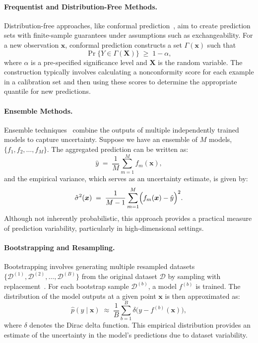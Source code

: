 \paragraph{Frequentist and Distribution-Free Methods.}
Distribution-free approaches, like conformal prediction~\citep{shafer2008tutorial, fontana2023conformal}, aim to create prediction sets with finite-sample guarantees under assumptions such as exchangeability. For a new observation $\bm{x}$, conformal prediction constructs a set $\Gamma(\bm{x})$ such that
\begin{equation}
\Pr\{ Y \in \Gamma(\bm{X}) \} \;\geq\; 1 - \alpha,
\end{equation}
where $\alpha$ is a pre-specified significance level and $\bm{X}$ is the random variable. The construction typically involves calculating a nonconformity score for each example in a calibration set and then using these scores to determine the appropriate quantile for new predictions.

\paragraph{Ensemble Methods.}
Ensemble techniques~\citep{lakshminarayanan2017simple} combine the outputs of multiple independently trained models to capture uncertainty. Suppose we have an ensemble of $M$ models, $\{ f_1, f_2, \dots, f_M \}$. The aggregated prediction can be written as:
\begin{equation}
\hat{y} \;=\; \frac{1}{M} \sum_{m=1}^{M} f_m(\bm{x}),
\end{equation}
and the empirical variance, which serves as an uncertainty estimate, is given by:
\begin{equation}
\hat{\sigma}^2(\bm{x}) \;=\; \frac{1}{M-1} \sum_{m=1}^{M} \Bigl( f_m(\bm{x}) - \hat{y} \Bigr)^2.
\end{equation}
Although not inherently probabilistic, this approach provides a practical measure of prediction variability, particularly in high-dimensional settings.

\paragraph{Bootstrapping and Resampling.}
Bootstrapping involves generating multiple resampled datasets $\{\mathcal{D}^{(1)}, \mathcal{D}^{(2)}, \dots, \mathcal{D}^{(B)}\}$ from the original dataset $\mathcal{D}$ by sampling with replacement~\citep{breiman1996bagging}. For each bootstrap sample $\mathcal{D}^{(b)}$, a model $f^{(b)}$ is trained. The distribution of the model outputs at a given point $\bm{x}$ is then approximated as:
\begin{equation}
\hat{p}(y \mid \bm{x}) \;\approx\; \frac{1}{B} \sum_{b=1}^{B} \delta\bigl(y - f^{(b)}(\bm{x})\bigr),
\end{equation}
where $\delta$ denotes the Dirac delta function. This empirical distribution provides an estimate of the uncertainty in the model's predictions due to dataset variability.


